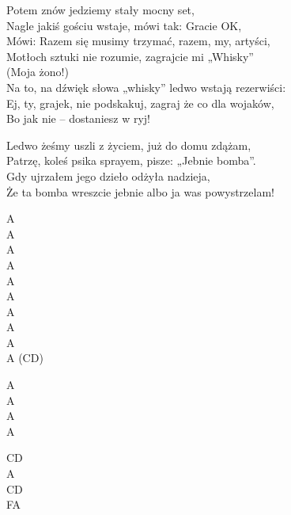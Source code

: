 \begin{text}
{Potem znów jedziemy stały mocny set,\\
Nagle jakiś gościu wstaje, mówi tak: Gracie OK,\\
Mówi: Razem się musimy trzymać, razem, my, artyści,\\
Motłoch sztuki nie rozumie, zagrajcie mi „Whisky”\\
(Moja żono!)\\
Na to, na dźwięk słowa „whisky” ledwo wstają rezerwiści:\\
Ej, ty, grajek, nie podskakuj, zagraj że co dla wojaków,\\
Bo jak nie – dostaniesz w ryj!

Ledwo żeśmy uszli z życiem, już do domu zdążam,\\
Patrzę, koleś psika sprayem, pisze: „Jebnie bomba”.\\
Gdy ujrzałem jego dzieło odżyła nadzieja,\\
Że ta bomba wreszcie jebnie albo ja was powystrzelam!
}
\end{text}
\begin{chord}
    \footnotesize{
    A\\
    A\\
    A\\
    A\\
    A\\
    A\\
    A\\
    A\\
    A\\
    A (CD)

    A\\
    A\\
    A\\
    A

    CD\\
    A\\
    CD\\
    FA
    }
\end{chord}